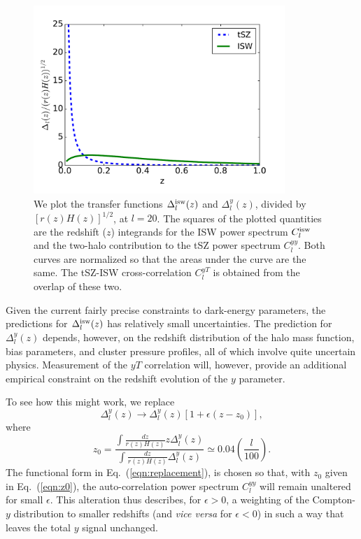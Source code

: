 \documentclass[aps,twocolumn,floats,prd,nofootinbib,10pt,floatfix]{revtex4-1}
\begin{document}
\begin{figure}[h]
\includegraphics[width=9.5cm, height = 7 cm]{redshift.pdf}
\caption{We plot the transfer functions $\Delta_l^{\rm isw}(z)$
     and $\Delta_l^y(z)$, divided by $[r(z)H(z)]^{1/2}$, at $l=20$. The
     squares of the plotted quantities are the redshift ($z$)
     integrands for the ISW power spectrum $C_l^{\rm isw}$ and
     the two-halo contribution to the tSZ power spectrum
     $C_l^{yy}$.  Both curves are normalized so that the
     areas under the curve are the same.  The tSZ-ISW
     cross-correlation $C_l^{yT}$ is obtained from the overlap
     of these two.}
\label{fig:Deltas}
\end{figure}

Given the current fairly precise constraints to dark-energy
parameters, the predictions for $\Delta_l^{\rm isw}(z)$ has
relatively small uncertainties.  The prediction for
$\Delta_l^y(z)$ depends, however, on the redshift distribution
of the halo mass function, bias parameters, and cluster pressure
profiles, all of which involve quite uncertain physics.
Measurement of the $yT$ correlation will, however, provide an
additional empirical constraint on the redshift evolution of the
$y$ parameter.

To see how this might work, we replace
\begin{equation}
     \Delta_l^y(z) \to \Delta_l^y(z) \left[ 1 +
     \epsilon (z-z_0) \right],
\label{eqn:replacement}
\end{equation}
where
\begin{equation}
     z_0 = \frac{ \int \frac{dz}{r(z)H(z)} z \Delta_l^y(z)}
     { \int \frac{dz}{r(z)H(z)} \Delta_l^y(z)} \simeq 0.04\left(\frac{l}{100}\right).
\label{eqn:z0}     
\end{equation}
The functional form in Eq.~(\ref{eqn:replacement}), is chosen so
that, with $z_0$ given in Eq.~(\ref{eqn:z0}), the
auto-correlation power spectrum $C_l^{yy}$ will remain unaltered
for small $\epsilon$.  This alteration thus describes, for
$\epsilon>0$, a weighting of the Compton-$y$ distribution to
smaller redshifts (and {\it vice versa} for $\epsilon<0$) in
such a way that leaves the total $y$ signal unchanged.
\end{document}
